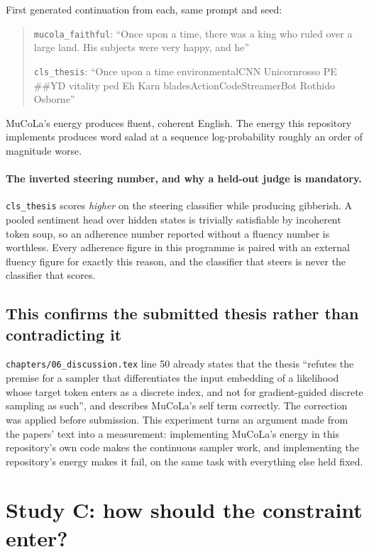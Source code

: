 \documentclass[11pt,a4paper]{article}
\newcommand{\file}[1]{\texttt{\small #1}}
\begin{document}
First generated continuation from each, same prompt and seed:

\begin{quote}
\texttt{mucola\_faithful}: ``Once upon a time, there was a king who ruled over a large
land. His subjects were very happy, and he''

\texttt{cls\_thesis}: ``Once upon a time environmentalCNN Unicornrosso PE \#\#YD vitality
ped Eh Karn bladesActionCodeStreamerBot Rothido Osborne''
\end{quote}

MuCoLa's energy produces fluent, coherent English. The energy this repository implements
produces word salad at a sequence log-probability roughly an order of magnitude worse.

\paragraph{The inverted steering number, and why a held-out judge is mandatory.}
\texttt{cls\_thesis} scores \emph{higher} on the steering classifier while producing
gibberish. A pooled sentiment head over hidden states is trivially satisfiable by
incoherent token soup, so an adherence number reported without a fluency number is
worthless. Every adherence figure in this programme is paired with an external fluency
figure for exactly this reason, and the classifier that steers is never the classifier
that scores.

\subsection{This confirms the submitted thesis rather than contradicting it}

\file{chapters/06\_discussion.tex} line 50 already states that the thesis ``refutes the
premise for a sampler that differentiates the input embedding of a likelihood whose
target token enters as a discrete index, and not for gradient-guided discrete sampling
as such'', and describes MuCoLa's self term correctly. The correction was applied before
submission. This experiment turns an argument made from the papers' text into a
measurement: implementing MuCoLa's energy in this repository's own code makes the
continuous sampler work, and implementing the repository's energy makes it fail, on the
same task with everything else held fixed.

\section{Study C: how should the constraint enter?}
\end{document}
